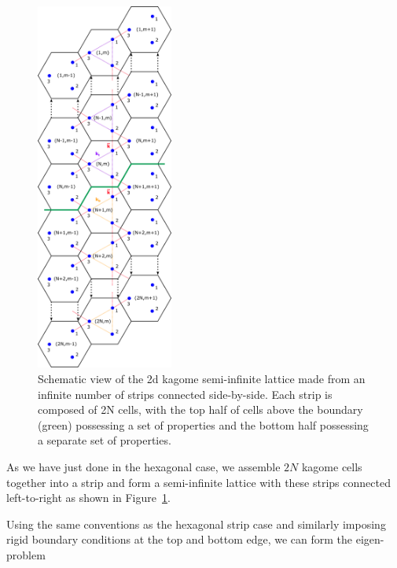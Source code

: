 \begin{figure}[!h]
\centering
\includegraphics[width=0.4\textwidth]{imgs/kagomestripmodel.png}
\caption{\label{fig:kagomestripmodel} Schematic view of the 2d kagome
  semi-infinite lattice made from an infinite number of strips connected
  side-by-side. Each strip is composed of 2N cells, with the top half of cells
  above the boundary (green) possessing a set of properties and the bottom half
  possessing a separate set of properties.}
\end{figure}

As we have just done in the hexagonal case, we assemble $2N$ kagome cells
together into a strip and form a semi-infinite lattice with these strips
connected left-to-right as shown in Figure~\ref{fig:kagomestripmodel}.

Using the same conventions as the hexagonal strip case and similarly imposing
rigid boundary conditions at the top and bottom edge, we can form the
eigen-problem


